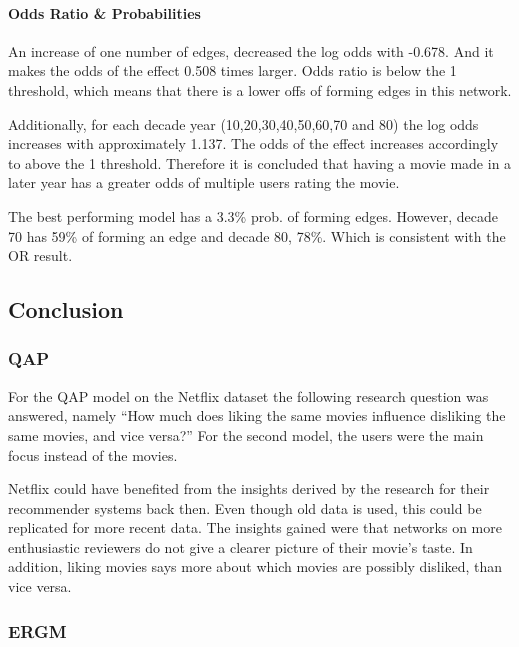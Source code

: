 \documentclass[
  english,
  man,floatsintext]{apa6}
\let\oldparagraph\paragraph
\renewcommand{\paragraph}[1]{\oldparagraph{#1}\mbox{}}
\begin{document}
\hypertarget{odds-ratio-probabilities}{%
\paragraph{Odds Ratio \& Probabilities}\label{odds-ratio-probabilities}}

An increase of one number of edges, decreased the log odds with -0.678. And it makes the odds of the effect 0.508 times larger. Odds ratio is below the 1 threshold, which means that there is a lower offs of forming edges in this network.

Additionally, for each decade year (10,20,30,40,50,60,70 and 80) the log odds increases with approximately 1.137. The odds of the effect increases accordingly to above the 1 threshold. Therefore it is concluded that having a movie made in a later year has a greater odds of multiple users rating the movie.

The best performing model has a 3.3\% prob. of forming edges. However, decade 70 has 59\% of forming an edge and decade 80, 78\%. Which is consistent with the OR result.

\hypertarget{conclusion}{%
\subsection{Conclusion}\label{conclusion}}

\hypertarget{qap-1}{%
\subsubsection{QAP}\label{qap-1}}

For the QAP model on the Netflix dataset the following research question was answered, namely ``How much does liking the same movies influence disliking the same movies, and vice versa?'' For the second model, the users were the main focus instead of the movies.

Netflix could have benefited from the insights derived by the research for their recommender systems back then. Even though old data is used, this could be replicated for more recent data. The insights gained were that networks on more enthusiastic reviewers do not give a clearer picture of their movie's taste. In addition, liking movies says more about which movies are possibly disliked, than vice versa.

\hypertarget{ergm-2}{%
\subsubsection{ERGM}\label{ergm-2}}
\end{document}
